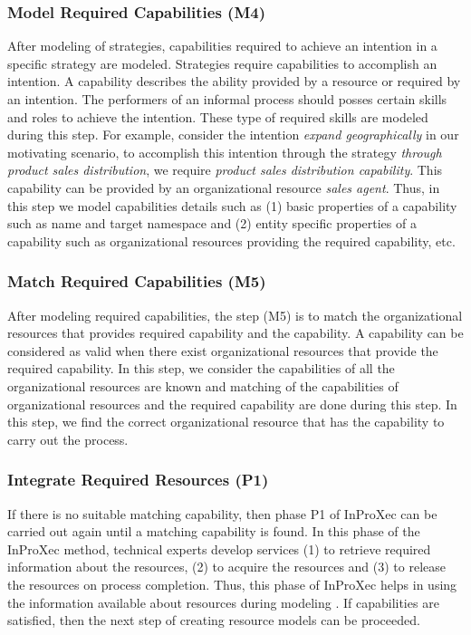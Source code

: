 \subsubsection{Model Required Capabilities (M4)}  
After modeling of strategies, capabilities required to achieve an intention in a specific strategy are modeled. Strategies require capabilities to accomplish an intention. A capability describes the ability provided by a resource or required by an intention. The performers of an informal process should posses certain skills and roles to achieve the intention. These type of required skills are modeled during this step. For example, consider the intention \textit{expand geographically} in our motivating scenario, to accomplish this intention through the strategy \textit{through product sales distribution}, we require \textit{product sales distribution capability}. This capability can be provided by an organizational resource \textit{sales agent}. Thus, in this step we model capabilities details such as (1) basic properties of a capability such as name and target namespace and (2) entity specific properties of a capability such as organizational resources providing the required capability, etc.

\subsubsection{Match Required Capabilities (M5)} 
After modeling required capabilities, the step (M5) is to match the organizational resources that provides required capability and the capability. A capability can be considered as valid when there exist organizational resources that provide the required capability. In this step, we consider the capabilities of all the organizational resources are known and matching of the capabilities of organizational resources and the required capability are done during this step. In this step, we find the correct organizational resource that has the capability to carry out the process. 

\subsubsection{Integrate Required Resources (P1)} 
If there is no suitable matching capability, then phase P1 of InProXec can be carried out again until a matching capability is found. In this phase of the InProXec method, technical experts develop services (1) to retrieve required information about the resources, (2) to acquire the resources and (3) to release the resources on process completion. Thus, this phase of InProXec helps in using the information available about resources during modeling \cite{Sungur2015}. If capabilities are satisfied, then the next step of creating resource models can be proceeded.

